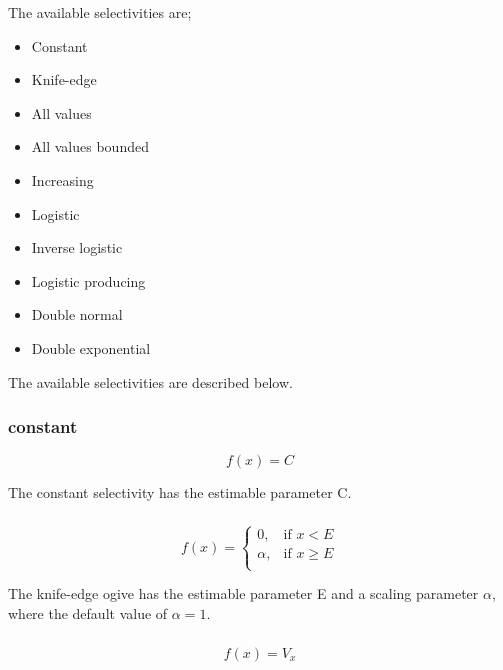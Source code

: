 The available selectivities are;

\begin{itemize}
  \item Constant
  \item Knife-edge
  \item All values
  \item All values bounded
  \item Increasing
  \item Logistic
  \item Inverse logistic
  \item Logistic producing
  \item Double normal
  \item Double exponential
\end{itemize}

The available selectivities are described below.

\subsubsection[Constant]{{constant}}

\begin{equation}
f(x)=C
\end{equation}

The constant selectivity has the estimable parameter C.

\subsubsection[Knife-edge]{}
\begin{equation}
f(x)= \begin{cases}
  0, & \text{if $x < E$} \\
  \alpha, & \text{if $x \ge E$}\\
  \end{cases}
\end{equation}

The knife-edge ogive has the estimable parameter E and a scaling parameter $\alpha$, where the default value of $\alpha = 1$.

\subsubsection[All-values]{}

\begin{equation}
f(x)=V_x
\end{equation}

